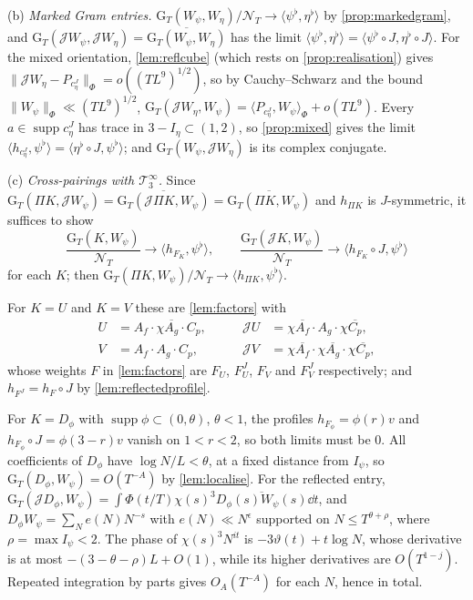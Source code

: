 \documentclass[11pt,colorlinks]{charlie}
\newcommand{\ip}[2]{\langle #1,#2\rangle}
\begin{document}
(b) \emph{Marked Gram entries.} $\mathrm G_T(W_\psi,W_\eta)/\mathcal N_T\to\ip{\psi^\flat}{\eta^\flat}$ by \cref{prop:markedgram}, and $\mathrm G_T(\mathcal JW_\psi,\mathcal JW_\eta)=\overline{\mathrm G_T(W_\psi,W_\eta)}$ has the limit $\ip{\psi^\flat}{\eta^\flat}=\ip{\psi^\flat\circ J}{\eta^\flat\circ J}$. For the mixed orientation, \cref{lem:reflcube} (which rests on \cref{prop:realisation}) gives $\|\mathcal JW_\eta-P_{c_\eta^J}\|_\Phi=o((TL^9)^{1/2})$, so by Cauchy--Schwarz and the bound $\|W_\psi\|_\Phi\ll(TL^9)^{1/2}$, $\mathrm G_T(\mathcal JW_\eta,W_\psi)=\ip{P_{c_\eta^J}}{W_\psi}_\Phi+o(TL^9)$. Every $a\in\operatorname{supp}c_\eta^J$ has trace in $3-I_\eta\subset(1,2)$, so \cref{prop:mixed} gives the limit $\ip{h_{c_\eta^J}}{\psi^\flat}=\ip{\eta^\flat\circ J}{\psi^\flat}$; and $\mathrm G_T(W_\psi,\mathcal JW_\eta)$ is its complex conjugate.

(c) \emph{Cross-pairings with $\mathcal T_3^\infty$.} Since $\mathrm G_T(\Pi K,\mathcal JW_\psi)=\overline{\mathrm G_T(\mathcal J\Pi K,W_\psi)}=\overline{\mathrm G_T(\Pi K,W_\psi)}$ and $h_{\Pi K}$ is $J$-symmetric, it suffices to show
\[
 \frac{\mathrm G_T(K,W_\psi)}{\mathcal N_T}\to\ip{h_{F_K}}{\psi^\flat},\qquad\frac{\mathrm G_T(\mathcal JK,W_\psi)}{\mathcal N_T}\to\ip{h_{F_K}\circ J}{\psi^\flat}
\]
for each $K$; then $\mathrm G_T(\Pi K,W_\psi)/\mathcal N_T\to\ip{h_{\Pi K}}{\psi^\flat}$.

For $K=U$ and $K=V$ these are \cref{lem:factors} with
\[
 \begin{aligned}
 U&=A_f\cdot\chi\overline{A_g}\cdot C_p,&\qquad\mathcal JU&=\chi\overline{A_f}\cdot A_g\cdot\chi\overline{C_p},\\
 V&=A_f\cdot A_g\cdot C_p,&\qquad\mathcal JV&=\chi\overline{A_f}\cdot\chi\overline{A_g}\cdot\chi\overline{C_p},
 \end{aligned}
\]
whose weights $F$ in \cref{lem:factors} are $F_U$, $F_U^J$, $F_V$ and $F_V^J$ respectively; and $h_{F^J}=h_F\circ J$ by \cref{lem:reflectedprofile}.

For $K=D_\phi$ with $\operatorname{supp}\phi\subset(0,\theta)$, $\theta<1$, the profiles $h_{F_\phi}=\phi(r)v$ and $h_{F_\phi}\circ J=\phi(3-r)v$ vanish on $1<r<2$, so both limits must be $0$. All coefficients of $D_\phi$ have $\log N/L<\theta$, at a fixed distance from $I_\psi$, so $\mathrm G_T(D_\phi,W_\psi)=O(T^{-A})$ by \cref{lem:localise}. For the reflected entry, $\mathrm G_T(\mathcal JD_\phi,W_\psi)=\int\Phi(t/T)\chi(s)^3\overline{D_\phi(s)W_\psi(s)}\dd t$, and $D_\phi W_\psi=\sum_Ne(N)N^{-s}$ with $e(N)\ll N^\epsilon$ supported on $N\le T^{\theta+\rho}$, where $\rho=\max I_\psi<2$. The phase of $\chi(s)^3N^{it}$ is $-3\vartheta(t)+t\log N$, whose derivative is at most $-(3-\theta-\rho)L+O(1)$, while its higher derivatives are $O(T^{1-j})$. Repeated integration by parts gives $O_A(T^{-A})$ for each $N$, hence in total.
\end{document}
